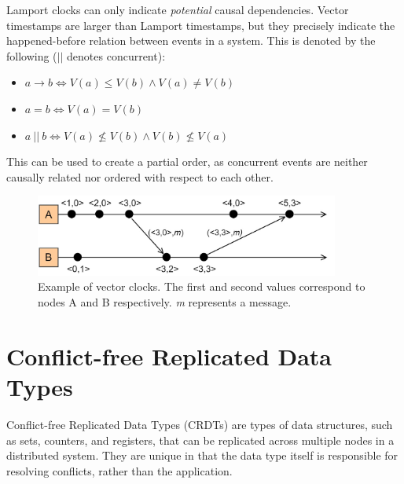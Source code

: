 \documentclass[12pt]{report}
\begin{document}
Lamport clocks can only indicate \emph{potential} causal dependencies. Vector timestamps are larger than Lamport timestamps, but they precisely indicate the happened-before relation between events in a system. This is denoted by the following ($\vert \vert$ denotes concurrent):

\begin{itemize}
    \item $a \rightarrow b \iff V(a) \leq V(b) \land V(a) \not = V(b)$
    \item $a = b \iff V(a) = V(b)$
    \item $a \: || \:  b \iff V(a) \not \leq V(b) \land V(b) \not \leq V(a)$
\end{itemize}

This can be used to create a partial order, as concurrent events are neither causally related nor ordered with respect to each other.

\begin{figure}
    \centering
    \includegraphics[width=10cm]{images/VectorClocks.jpg}
    \caption{Example of vector clocks. The first and second values correspond to nodes A and B respectively. \textit{m} represents a message.}
    \label{fig:vector}
\end{figure}

\section{Conflict-free Replicated Data Types}
Conflict-free Replicated Data Types (CRDTs) are types of data structures, such as sets, counters, and registers, that can be replicated across multiple nodes in a distributed system. They are unique in that the data type itself is responsible for resolving conflicts, rather than the application. 
\end{document}
